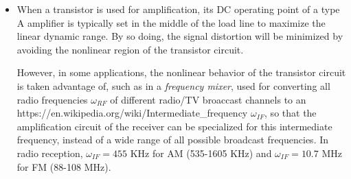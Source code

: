 \documentclass{article}
\begin{document}
\begin{itemize}

\item {}

When a transistor is used for amplification, its DC operating point of 
a type A amplifier is typically set in the middle of the load line to 
maximize the linear dynamic range. By so doing, the signal distortion 
will be minimized by avoiding the nonlinear region of the transistor 
circuit.

However, in some applications, the nonlinear behavior of the transistor 
circuit is taken advantage of, such as in a {\em frequency mixer}, used
for converting all radio frequencies $\omega_{RF}$ of different radio/TV 
broaccast channels to an  
{https://en.wikipedia.org/wiki/Intermediate_frequency} $\omega_{IF}$, so 
that the amplification circuit of the receiver can be specialized for 
this intermediate frequency, instead of a wide range of all possible
broadcast frequencies. In radio reception, $\omega_{IF}=455$ KHz for AM 
(535-1605 KHz) and $\omega_{IF}=10.7$ MHz for FM (88-108 MHz). 



\end{itemize}
\end{document}
